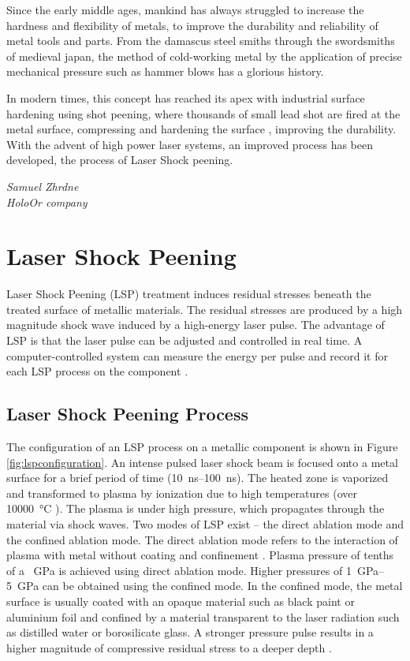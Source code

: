 \epigraph{Since the early middle ages, mankind has always struggled to increase the hardness and flexibility of metals, to improve the durability and reliability of  metal tools and parts. From the damascus steel smiths through the swordsmiths of medieval japan, the method of cold-working metal by the application of precise mechanical pressure such as hammer blows has a glorious history.

In modern times, this concept has reached its apex with industrial surface hardening using shot peening, where thousands of small lead shot are fired at the metal surface, compressing and hardening the surface , improving the durability. With the advent of high power laser systems, an improved process has been developed, the process of Laser Shock peening.}{\textit{Samuel Zhrdne\\ HoloOr company}}

\section{Laser Shock Peening}

Laser Shock Peening (LSP) treatment induces residual stresses beneath the treated surface of metallic materials. The residual stresses are produced by a high magnitude shock wave induced by a high-energy laser pulse. The advantage of LSP is that the laser pulse can be adjusted and controlled in real time. A computer-controlled system can measure the energy per pulse and record it for each LSP process on the component \cite{mannava}.

\subsection{Laser Shock Peening Process}
The configuration of an LSP process on a metallic component is shown in Figure \ref{fig:lspconfiguration}. An intense pulsed laser shock beam is focused onto a metal surface for a brief period of time (\SIrange{10}{100}{\ns}). The heated zone is vaporized and transformed to plasma by ionization due to high temperatures (over \SI{10000}{\degreeCelsius} ). The plasma is under high pressure, which propagates through the material via shock waves. Two modes of LSP exist – the direct ablation mode and the confined ablation mode. The direct ablation mode refers to the interaction of plasma with metal without coating and confinement \cite{sano}. Plasma pressure of tenths of a \SI{}{\GPa} is achieved using direct ablation mode. Higher pressures of \SIrange{1}{5}{\GPa} can be obtained using the confined mode. In the confined mode, the metal surface is usually coated with an opaque material such as black paint or aluminium foil and confined by a material transparent to the laser radiation such as distilled water or borosilicate glass. A stronger pressure pulse results in a higher magnitude of compressive residual stress to a deeper depth \cite{fairland}.

